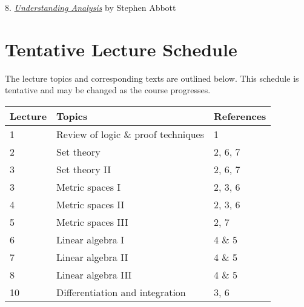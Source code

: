 \documentclass[12pt]{article}
\begin{document}
8.  \href{https://link-springer-com.myaccess.library.utoronto.ca/book/10.1007/978-1-4939-2712-8}{{\emph{Understanding Analysis}}} by Stephen Abbott

%
%




\section{Tentative Lecture Schedule}
The lecture topics and corresponding texts are outlined below.  This schedule is tentative and may be changed as the course progresses.


\begin{longtable}{| p{1.5cm}  | p{8cm} | p{3cm} |}
\hline
{\bf{Lecture}}  & {\bf{Topics}} &  {\bf{References}} \\
\hline
1  & Review of logic \& proof techniques &  1 \\
\hline
2  & Set theory & 2, 6, 7 \\
\hline
3  & Set theory II & 2, 6, 7 \\
\hline
3  &  Metric spaces I &  2, 3, 6\\
\hline
4  & Metric spaces II &  2, 3, 6\\
\hline
5  & Metric spaces III & 2, 7 \\
\hline
6 &  Linear algebra I & 4 \& 5 \\
\hline
7  &  Linear algebra II & 4 \& 5 \\
 \hline
8  & Linear algebra III &  4 \& 5 \\
 \hline
10  &  Differentiation and integration & 3,  6\\
\hline
\end{longtable}
\end{document}
